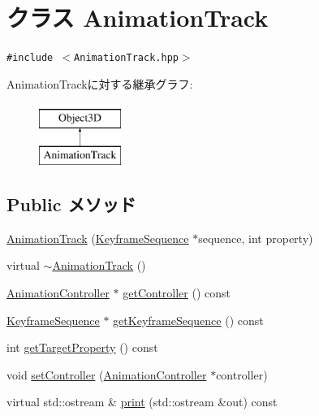 \hypertarget{classm3g_1_1AnimationTrack}{
\section{クラス AnimationTrack}
\label{classm3g_1_1AnimationTrack}
}
{\tt \#include $<$AnimationTrack.hpp$>$}

AnimationTrackに対する継承グラフ:\begin{figure}[H]
\begin{center}
\leavevmode
\includegraphics[height=2cm]{classm3g_1_1AnimationTrack}
\end{center}
\end{figure}
\subsection*{Public メソッド}
\begin{CompactItemize}
\item 
\hyperlink{classm3g_1_1AnimationTrack_e27012f60e982597d6e504c488e51106}{AnimationTrack} (\hyperlink{classm3g_1_1KeyframeSequence}{KeyframeSequence} $\ast$sequence, int property)
\item 
virtual \hyperlink{classm3g_1_1AnimationTrack_f7f1bc360c298d4a2f2436889159205c}{$\sim$AnimationTrack} ()
\item 
\hyperlink{classm3g_1_1AnimationController}{AnimationController} $\ast$ \hyperlink{classm3g_1_1AnimationTrack_3a54e89528127de5b4d0a48a2045a91c}{getController} () const 
\item 
\hyperlink{classm3g_1_1KeyframeSequence}{KeyframeSequence} $\ast$ \hyperlink{classm3g_1_1AnimationTrack_e83c81771a8329e1e5f978f228c0b308}{getKeyframeSequence} () const 
\item 
int \hyperlink{classm3g_1_1AnimationTrack_143de0bf90b434f1487caae5b0b66bbf}{getTargetProperty} () const 
\item 
void \hyperlink{classm3g_1_1AnimationTrack_639279dfdc74095fcb28d0c25aeec6df}{setController} (\hyperlink{classm3g_1_1AnimationController}{AnimationController} $\ast$controller)
\item 
virtual std::ostream \& \hyperlink{classm3g_1_1AnimationTrack_6fea17fa1532df3794f8cb39cb4f911f}{print} (std::ostream \&out) const 
\end{CompactItemize}
